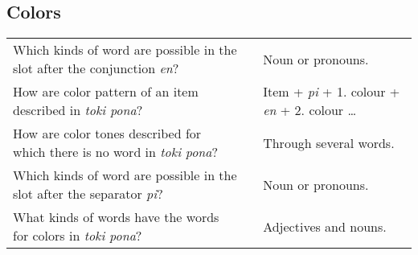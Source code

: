 \newpage
%
\subsection*{Colors}
\label{'colors'}
%
\begin{supertabular}{p{5,5cm}|ll}
    Which kinds of word are possible in the slot after the conjunction \textit{en}? &  & Noun or pronouns.                                              \\ %
    How are color pattern of an item described in \textit{toki pona}?               &  & Item + \textit{pi} + 1. colour + \textit{en} + 2. colour \dots \\ %
    How are color tones described for which there is no word in \textit{toki pona}? &  & Through several words.                                         \\ %
    Which kinds of word are possible in the slot after the separator \textit{pi}?   &  & Noun or pronouns.                                              \\ %
    What kinds of words have the words for colors in \textit{toki pona}?            &  & Adjectives and nouns.                                          \\ %
\end{supertabular}

